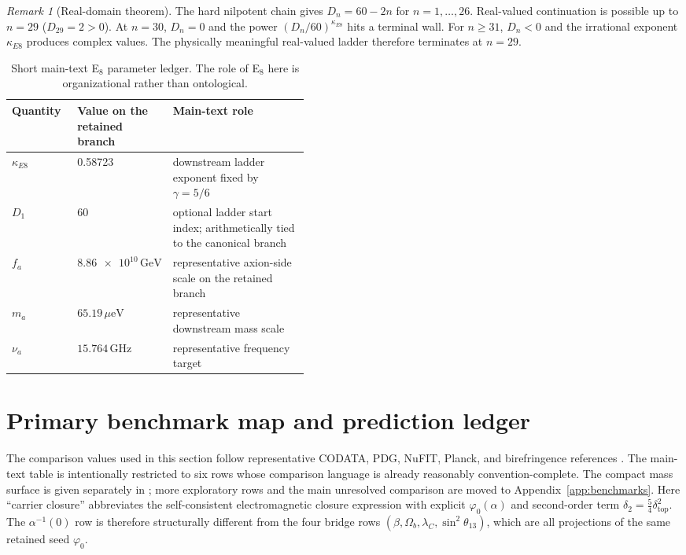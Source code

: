 \documentclass[11pt,a4paper]{article}
\theoremstyle{definition}
\theoremstyle{remark}
\newtheorem*{remark}{Remark}
\newcommand{\phiz}{\varphi_0}
\newcommand{\deltatop}{\delta_{\mathrm{top}}}
\begin{document}
\begin{remark}[Real-domain theorem]
The hard nilpotent chain gives $D_n=60-2n$ for $n=1,\dots,26$. Real-valued continuation is possible up to $n=29$ ($D_{29}=2>0$). At $n=30$, $D_n=0$ and the power $(D_n/60)^{\kappa_{E8}}$ hits a terminal wall. For $n\ge31$, $D_n<0$ and the irrational exponent $\kappa_{E8}$ produces complex values. The physically meaningful real-valued ladder therefore terminates at $n=29$.
\end{remark}

\begin{table}[t]
\centering
\small
\begin{tabularx}{\linewidth}{@{}>{\raggedright\arraybackslash}p{0.22\linewidth}>{\raggedright\arraybackslash}p{0.22\linewidth}Y@{}}
\toprule
Quantity & Value on the retained branch & Main-text role \\
\midrule
$\kappa_{E8}$ & \num{0.58723} & downstream ladder exponent fixed by $\gamma=5/6$ \\
$D_1$ & $60$ & optional ladder start index; arithmetically tied to the canonical branch \\
$f_a$ & $\num{8.86e10}\,\mathrm{GeV}$ & representative axion-side scale on the retained branch \\
$m_a$ & $\num{65.19}\,\mu\mathrm{eV}$ & representative downstream mass scale \\
$\nu_a$ & $\num{15.764}\,\mathrm{GHz}$ & representative frequency target \\
\bottomrule
\end{tabularx}
\caption{Short main-text E$_8$ parameter ledger. The role of E$_8$ here is organizational rather than ontological.}
\label{tab:e8-main-text}
\end{table}

\section{Primary benchmark map and prediction ledger}

The comparison values used in this section follow representative CODATA, PDG, NuFIT, Planck, and birefringence references \cite{codata2022,pdg2025,nufit2025,planck2018,minamiKomatsu2020,eskilt2023,sullivan2025}. The main-text table is intentionally restricted to six rows whose comparison language is already reasonably convention-complete. The compact mass surface is given separately in ; more exploratory rows and the main unresolved comparison are moved to Appendix~\ref{app:benchmarks}.
Here \enquote{carrier closure} abbreviates the self-consistent electromagnetic closure expression with explicit $\phiz(\alpha)$ and second-order term $\delta_2=\frac54\deltatop^2$. The $\alpha^{-1}(0)$ row is therefore structurally different from the four bridge rows $(\beta,\Omega_b,\lambda_C,\sin^2\theta_{13})$, which are all projections of the same retained seed $\phiz$.
\end{document}
